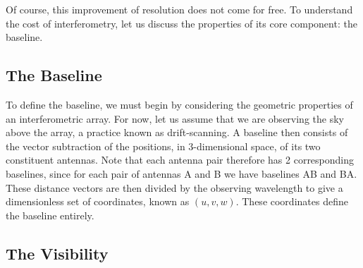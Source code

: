 \pg
Of course, this improvement of resolution does not come for free. To understand the cost of interferometry, let us discuss the properties of its core component: the baseline.

\subsection{The Baseline}

\pg
To define the baseline, we must begin by considering the geometric properties of an interferometric array. For now, let us assume that we are observing the sky above the array, a practice known as drift-scanning. A baseline then consists of the vector subtraction of the positions, in 3-dimensional space, of its two constituent antennas. Note that each antenna pair therefore has 2 corresponding baselines, since for each pair of antennas A and B we have baselines AB and BA. These distance vectors are then divided by the observing wavelength to give a dimensionless set of coordinates, known as $(u,v,w)$. These coordinates define the baseline entirely. 

\subsection{The Visibility}


